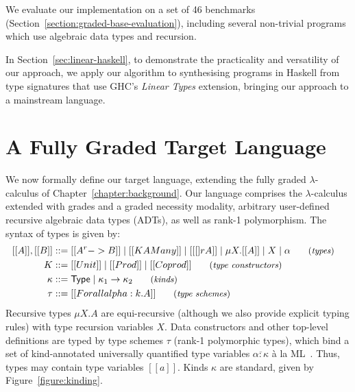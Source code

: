 We evaluate our implementation on a set of 46 benchmarks
(Section~\ref{section:graded-base-evaluation}), including several non-trivial
programs which use algebraic data types and recursion.

In Section~\ref{sec:linear-haskell}, to demonstrate the practicality and
versatility of our approach, we apply our algorithm to synthesising programs in
Haskell from type signatures that use GHC's \emph{Linear Types} extension,
bringing our approach to a mainstream language.

\section{A Fully Graded Target Language}
\label{section:graded-base-typing}

We now formally define our target language, extending the fully graded
$\lambda$-calculus of Chapter~\ref{chapter:background}. Our language comprises
the $\lambda$-calculus extended with grades and a graded necessity modality,
arbitrary user-defined recursive algebraic data types (ADTs), as well as rank-1
polymorphism. The syntax of types is given by:
\begin{align*}
    \hspace{-0.9em}[[ A ]] , [[ B ]] & ::=
           [[ A ^ r -> B ]]
      \mid [[ K {A Many} ]]
      \mid [[ [] r A ]]
      \mid \mu X . [[ A ]]
      \mid X
      \mid \alpha
    {\small{\tag{\textit{types}}}}
    \\
    \hspace{-0.9em} K & ::=
           [[ Unit ]]
      \mid [[ Prod ]]
      \mid [[ Coprod ]]
    {\small{\tag{\textit{type constructors}}}}
    \\
  \hspace{-0.9em} \kappa & ::= 
    \mathsf{Type}
    \mid \kappa_1 \rightarrow \kappa_2
    {\small{\tag{\textit{kinds}}}}
    \\
    \hspace{-0.9em} \tau & ::=
           [[ Forall alpha : k . A  ]]
    {\small{\tag{\textit{type schemes}}}}
\end{align*}
Recursive types $\mu X . A$ are equi-recursive (although we also provide
explicit typing rules) with type recursion variables $X$. Data constructors and
other top-level definitions are typed by type schemes $\tau$ (rank-1 polymorphic
types), which bind a set of kind-annotated universally quantified type variables
$\overline{\alpha : \kappa}$ à la ML~\citep{milner1978theory}. Thus,
types may contain type variables $[[ a ]]$. Kinds $\kappa$ are standard, given
by Figure~\ref{figure:kinding}.

